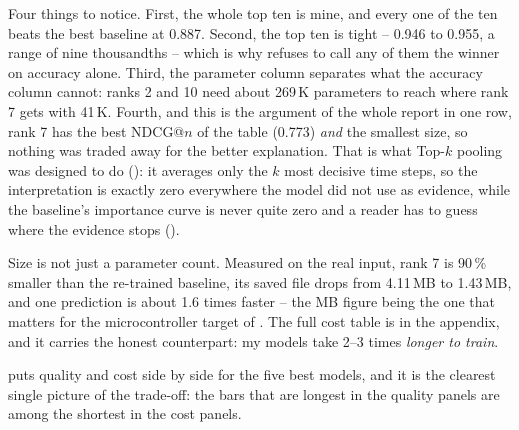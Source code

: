 
Four things to notice. First, the whole top ten is mine, and every one of the ten beats the best
baseline at 0.887. Second, the top ten is tight -- 0.946 to 0.955, a range of nine thousandths --
which is why  refuses to call any of them the winner on accuracy alone.
Third, the parameter column separates what the accuracy column cannot: ranks 2 and 10 need about
269\,K parameters to reach where rank 7 gets with 41\,K. Fourth, and this is the argument of the
whole report in one row, rank 7 has the best NDCG@$n$ of the table (0.773) \emph{and} the smallest
size, so nothing was traded away for the better explanation. That is what Top-$k$ pooling was
designed to do (): it averages only the $k$ most decisive time steps, so the
interpretation is exactly zero everywhere the model did not use as evidence, while the baseline's
importance curve is never quite zero and a reader has to guess where the evidence stops
().

Size is not just a parameter count. Measured on the real \webtraffic{} input, rank 7 is 90\,\%
smaller than the re-trained baseline, its saved file drops from 4.11\,MB to 1.43\,MB, and one
prediction is about 1.6 times faster -- the MB figure being the one that matters for the
microcontroller target of . The full cost table is  in the
appendix, and it carries the honest counterpart: my models take 2--3 times \emph{longer to train}.

 puts quality and cost side by side for the five best models, and it is the
clearest single picture of the trade-off: the bars that are longest in the quality panels are among
the shortest in the cost panels.

